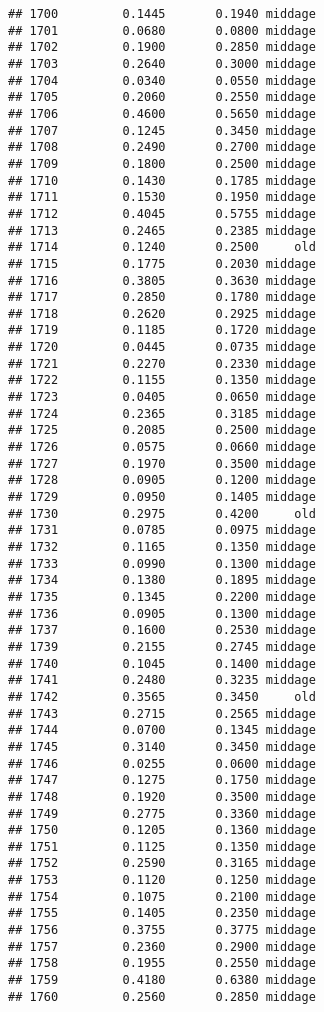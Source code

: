 \documentclass[
]{article}
\begin{document}
\begin{verbatim}
## 1700         0.1445       0.1940 middage
## 1701         0.0680       0.0800 middage
## 1702         0.1900       0.2850 middage
## 1703         0.2640       0.3000 middage
## 1704         0.0340       0.0550 middage
## 1705         0.2060       0.2550 middage
## 1706         0.4600       0.5650 middage
## 1707         0.1245       0.3450 middage
## 1708         0.2490       0.2700 middage
## 1709         0.1800       0.2500 middage
## 1710         0.1430       0.1785 middage
## 1711         0.1530       0.1950 middage
## 1712         0.4045       0.5755 middage
## 1713         0.2465       0.2385 middage
## 1714         0.1240       0.2500     old
## 1715         0.1775       0.2030 middage
## 1716         0.3805       0.3630 middage
## 1717         0.2850       0.1780 middage
## 1718         0.2620       0.2925 middage
## 1719         0.1185       0.1720 middage
## 1720         0.0445       0.0735 middage
## 1721         0.2270       0.2330 middage
## 1722         0.1155       0.1350 middage
## 1723         0.0405       0.0650 middage
## 1724         0.2365       0.3185 middage
## 1725         0.2085       0.2500 middage
## 1726         0.0575       0.0660 middage
## 1727         0.1970       0.3500 middage
## 1728         0.0905       0.1200 middage
## 1729         0.0950       0.1405 middage
## 1730         0.2975       0.4200     old
## 1731         0.0785       0.0975 middage
## 1732         0.1165       0.1350 middage
## 1733         0.0990       0.1300 middage
## 1734         0.1380       0.1895 middage
## 1735         0.1345       0.2200 middage
## 1736         0.0905       0.1300 middage
## 1737         0.1600       0.2530 middage
## 1739         0.2155       0.2745 middage
## 1740         0.1045       0.1400 middage
## 1741         0.2480       0.3235 middage
## 1742         0.3565       0.3450     old
## 1743         0.2715       0.2565 middage
## 1744         0.0700       0.1345 middage
## 1745         0.3140       0.3450 middage
## 1746         0.0255       0.0600 middage
## 1747         0.1275       0.1750 middage
## 1748         0.1920       0.3500 middage
## 1749         0.2775       0.3360 middage
## 1750         0.1205       0.1360 middage
## 1751         0.1125       0.1350 middage
## 1752         0.2590       0.3165 middage
## 1753         0.1120       0.1250 middage
## 1754         0.1075       0.2100 middage
## 1755         0.1405       0.2350 middage
## 1756         0.3755       0.3775 middage
## 1757         0.2360       0.2900 middage
## 1758         0.1955       0.2550 middage
## 1759         0.4180       0.6380 middage
## 1760         0.2560       0.2850 middage

\end{verbatim}
\end{document}
